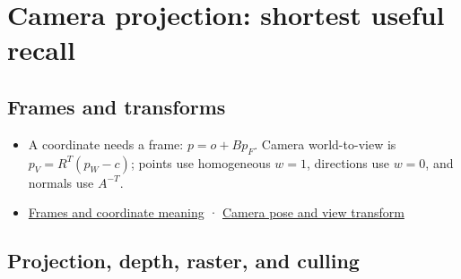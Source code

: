 \hypertarget{appendix-a2b71a18f5a2}{}\label{referencestart:appendix-a2b71a18f5a2}
\section{Camera projection: shortest useful recall}\label{appendix-a2b71a18f5a2-camera-projection-shortest-useful-recall}

\hypertarget{appendix-a2b71a18f5a2-camera-projection-shortest-useful-recall}{}


\subsection{Frames and transforms}\label{appendix-a2b71a18f5a2-frames-and-transforms}

\hypertarget{appendix-a2b71a18f5a2-frames-and-transforms}{}

\begin{itemize}
\tightlist
\item
  A coordinate needs a frame: \(p=o+Bp_F\). Camera world-to-view is \(p_V=R^T(p_W-c)\); points use homogeneous \(w=1\), directions use \(w=0\), and normals use \(A^{-T}\).
\item
  \hyperref[02-foundations-ii-ch032-a-coordinate-is-a-claim-about-a-frame]{Frames and coordinate meaning} · \hyperref[02-foundations-ii-ch032-a-camera-is-an-inverse-pose]{Camera pose and view transform}
\end{itemize}

\subsection{Projection, depth, raster, and culling}\label{appendix-a2b71a18f5a2-projection-depth-raster-and-culling}

\hypertarget{appendix-a2b71a18f5a2-projection-depth-raster-and-culling}{}

